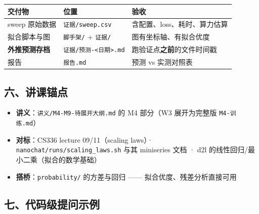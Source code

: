 \documentclass[
  chinese,
  11pt,
]{ctexart}
\newcounter{none} %
\providecommand{\tightlist}{%
  \setlength{\itemsep}{0pt}\setlength{\parskip}{0pt}}
\begin{document}
{\def\LTcaptype{none} %
\begin{longtable}[]{@{}
  >{\raggedright\arraybackslash}p{}
  >{\raggedright\arraybackslash}p{}
  >{\raggedright\arraybackslash}p{}@{}}
\toprule\noalign{}
\begin{minipage}[b]{\linewidth}\raggedright
交付物
\end{minipage} & \begin{minipage}[b]{\linewidth}\raggedright
位置
\end{minipage} & \begin{minipage}[b]{\linewidth}\raggedright
验收
\end{minipage} \\
\midrule\noalign{}
\endhead
\bottomrule\noalign{}
\endlastfoot
sweep 原始数据 & \texttt{证据/sweep.csv} & 含配置、loss、耗时、算力估算 \\
拟合脚本与图 & \texttt{脚手架/} + \texttt{证据/} & 图有坐标轴、有拟合优度 \\
\textbf{外推预测存档} & \texttt{证据/预测-\textless{}日期\textgreater{}.md} & 跑验证点\textbf{之前}的文件时间戳 \\
报告 & \texttt{报告.md} & 预测 vs 实测对照表 \\
\end{longtable}
}

\subsection{六、讲课锚点}\label{ux516dux8bb2ux8bfeux951aux70b9}

\begin{itemize}
\tightlist
\item
  \textbf{讲义}：\texttt{讲义/M4-M9-待展开大纲.md} 的 M4 部分（W3 展开为完整版 \texttt{M4-训练.md}）
\item
  \textbf{对标}：CS336 lecture 09/11（scaling laws）· \texttt{nanochat/runs/scaling\_laws.sh} 与其 miniseries 文档 · d2l 的线性回归/最小二乘（拟合的数学基础）
\item
  \textbf{搭桥}：\texttt{probability/} 的方差与回归 ------ 拟合优度、残差分析直接可用
\end{itemize}

\subsection{七、代码级提问示例}\label{ux4e03ux4ee3ux7801ux7ea7ux63d0ux95eeux793aux4f8b}
\end{document}

